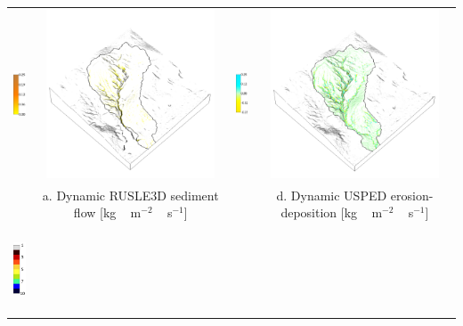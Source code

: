 \documentclass{standalone}
\begin{document}
\scriptsize
\centering 

\begin{tabular}{m{} m{} m{} m{}}
%
\multicolumn{1}{c}{\includegraphics[height=25mm]{../../images/rusle_3d/legend_flux.png}}
& \multicolumn{1}{c}{\includegraphics[height=50mm]{../../images/rusle_3d/flux.png}}
& \multicolumn{1}{c}{\includegraphics[height=25mm]{../../images/usped_3d/legend_erosion_deposition.png}}
& \multicolumn{1}{c}{\includegraphics[height=50mm]{../../images/usped_3d/erosion_deposition.png}}\\
\multicolumn{1}{c}{} 
& \multicolumn{1}{c}{a. Dynamic RUSLE3D sediment flow [kg ~ m$^{-2}$ ~ s$^{-1}$]}
& \multicolumn{1}{c}{} 
& \multicolumn{1}{c}{d. Dynamic USPED erosion-deposition [kg ~ m$^{-2}$ ~ s$^{-1}$]}\\
%
\multicolumn{1}{c}{\includegraphics[height=25mm]{../../images/rusle_3d/legend_landforms.png}}

\end{tabular}
\end{document}
